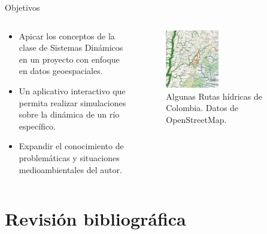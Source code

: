 \documentclass[17pt, t, lualatex]{beamer}
\begin{document}
\insertsectionpage

\begin{frame}{Objetivos}

  \begin{columns}
    \begin{column}{.4\textwidth}
      \begin{itemize}
        \item Apicar los conceptos de la clase de Sistemas Dinámicos en un proyecto con enfoque en datos geoespaciales.
        \item Un aplicativo interactivo que permita realizar simulaciones sobre la dinámica de un río específico.
        \item Expandir el conocimiento de problemáticas y situaciones medioambientales del autor. 
      \end{itemize}

      
    \end{column}

    \begin{column}{.6\textwidth}
      \begin{figure}[ht]
        \centering
        \includegraphics[width=0.45\textwidth]{img/3.png}
        \caption{\label{fig:3} Algunas Rutas hídricas de Colombia. Datos de OpenStreetMap\cite{waterwaymap}.}
      \end{figure}

    \end{column}
  \end{columns}

\end{frame}

\section{Revisión bibliográfica}

\insertsectionpage
\end{document}
